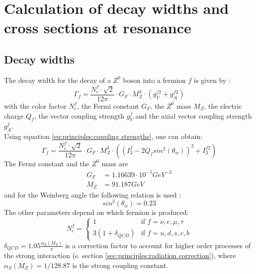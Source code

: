 \section{Calculation of decay widths and cross sections at resonance}
\subsection{Decay widths}
The decay width for the decay of a $Z^0$ boson into a fermion $f$ is given by \cite{muenchen}:
\begin{equation}
\Gamma_f=\frac{N_c^f \cdot \sqrt{2}}{12\pi}\cdot G_F \cdot M_Z^3 \cdot (g_V^{f2}+g_A^{f2})
\end{equation}
with the color factor $N_c^f$, the Fermi constant $G_F$, the $Z^0$ mass $M_Z$, the electric charge $Q_f$, the vector coupling strength $g_V^f$ and the axial vector coupling strength $g_A^f$.\\
Using equation \ref{eq:principles:coupling strengths}, one can obtain:
\begin{equation}
\Gamma_f=\frac{N_c^f \cdot \sqrt{2}}{12\pi}\cdot G_F \cdot M_Z^3 \cdot \left( \left( I^f_3-2 Q_f sin^2(\theta_w)\right)^2+I^{f2}_3 \right)
\label{eq:appendix:decay width}
\end{equation}
The Fermi constant and the  $Z^0$ mass are \cite{muenchen}
\begin{equation}
\begin{aligned}
G_F &= \unit{1.16639\cdot 10^{-5}}{GeV^{-2}} \\
M_Z &= \unit{91.187}{GeV}
\end{aligned}
\end{equation}
and for the Weinberg angle the following relation is used \cite{Grif}:
\begin{equation}
sin^2(\theta_w)=0.23 
\end{equation}
The other parameters depend on which fermion is produced:
\begin{equation}
N_c^f = \begin{cases}
1 & \text{if } f = \nu,e,\mu,\tau\\
3(1+\delta_{QCD}) & \text{if } f = u,d,s,c,b
\end{cases}
\end{equation}
$\delta_{QCD}= 1.05 \frac{\alpha_S(M_Z)}{\pi}$ is a correction factor to account for higher order processes of the strong interaction (s. section \ref{sec:principles:radiation correction}), where $\alpha_S(M_Z)=1/128.87$ is the strong coupling constant.\\
